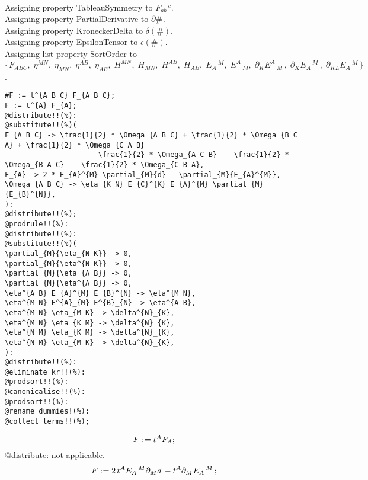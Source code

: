 \documentclass[11pt]{article}
\def\specialcolon{\mathrel{\mathop{:}}\hspace{-.5em}}
\begin{document}
\\
Assigning property TableauSymmetry to ${F}_{a b}\,^{c}$.
\\
Assigning property PartialDerivative to $\partial{\#}\, $.
\\
Assigning property KroneckerDelta to $\delta(\#)$.
\\
Assigning property EpsilonTensor to $\epsilon(\#)$.
\\
Assigning list property SortOrder to $\{{F}_{A B C},\; {\eta}^{M N},\; {\eta}_{M N},\; {\eta}^{A B},\; {\eta}_{A B},\; {H}^{M N},\; {H}_{M N},\; {H}^{A B},\; {H}_{A B},\; {E}_{A}\,^{M},\; {E}^{A}\,_{M},\; {\partial}_{K}{{E}^{A}\,_{M}}\, ,\; {\partial}_{K}{{E}_{A}\,^{M}}\, ,\; {\partial}_{K L}{{E}_{A}\,^{M}}\, \}$.
\\
{\color[named]{Blue}\begin{verbatim}
#F := t^{A B C} F_{A B C};
F := t^{A} F_{A};
@distribute!!(%):
@substitute!!(%)(
F_{A B C} -> \frac{1}{2} * \Omega_{A B C} + \frac{1}{2} * \Omega_{B C A} + \frac{1}{2} * \Omega_{C A B}
                    - \frac{1}{2} * \Omega_{A C B}  - \frac{1}{2} * \Omega_{B A C}  - \frac{1}{2} * \Omega_{C B A},
F_{A} -> 2 * E_{A}^{M} \partial_{M}{d} - \partial_{M}{E_{A}^{M}},
\Omega_{A B C} -> \eta_{K N} E_{C}^{K} E_{A}^{M} \partial_{M}{E_{B}^{N}},
):
@distribute!!(%);
@prodrule!!(%):
@distribute!!(%):
@substitute!!(%)(
\partial_{M}{\eta_{N K}} -> 0,
\partial_{M}{\eta^{N K}} -> 0,
\partial_{M}{\eta_{A B}} -> 0,
\partial_{M}{\eta^{A B}} -> 0,
\eta^{A B} E_{A}^{M} E_{B}^{N} -> \eta^{M N},
\eta^{M N} E^{A}_{M} E^{B}_{N} -> \eta^{A B},
\eta^{M N} \eta_{M K} -> \delta^{N}_{K},
\eta^{M N} \eta_{K M} -> \delta^{N}_{K},
\eta^{N M} \eta_{K M} -> \delta^{N}_{K},
\eta^{N M} \eta_{M K} -> \delta^{N}_{K},
):
@distribute!!(%):
@eliminate_kr!!(%):
@prodsort!!(%):
@canonicalise!!(%):
@prodsort!!(%):
@rename_dummies!(%):
@collect_terms!!(%);
\end{verbatim}}
\begin{dmath*}[compact, spread=2pt]
F\specialcolon{}= {t}^{A} {F}_{A};
\end{dmath*}
@distribute: not applicable.
\begin{dmath*}[compact, spread=2pt]
F\specialcolon{}= 2\, {t}^{A} {E}_{A}\,^{M} {\partial}_{M}{d}\,  - {t}^{A} {\partial}_{M}{{E}_{A}\,^{M}}\, ;
\end{dmath*}
\end{document}
